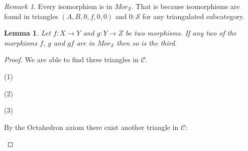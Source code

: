 \documentclass[12pt]{article}
\newtheorem{lemma}[theorem]{Lemma}
\theoremstyle{definition}
\theoremstyle{remark}
\newtheorem*{remark}{Remark}
\begin{document}
            \begin{remark}
                Every isomorphism is in $Mor_{\mathcal{S}}$. That is because isomorphisms are found in triangles $(A,B,0,f,0,0)$ and $0 : \mathcal{S}$ for any triangulated subcategory.
            \end{remark}

            \begin{lemma}
                Let $f : X \rightarrow Y$ and $g : Y \rightarrow Z$ be two morphisms. If any two of the morphisms $f$, $g$ and $gf$ are in $Mor_{\mathcal{S}}$ then so is the third.
            \end{lemma}

            \begin{proof}
                We are able to find three triangles in $\mathcal{C}$.
                \begin{center}
                    (1)
                    (2)
                    (3)
                \end{center}
                By the Octahedron axiom there exist another triangle in $\mathcal{C}$:
                \begin{center}
                    \begin{tikzcd}

\end{tikzcd}
\end{center}
\end{proof}
\end{document}
